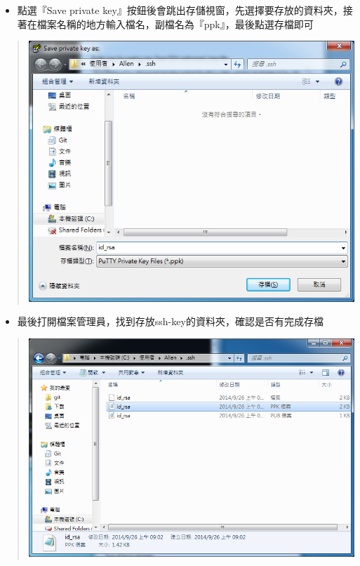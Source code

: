 \documentclass[letterpaper,10pt,english]{sphinxmanual}
\begin{document}
\begin{itemize}
\item {} 
點選『Save private key』按鈕後會跳出存儲視窗，先選擇要存放的資料夾，接著在檔案名稱的地方輸入檔名，副檔名為『ppk』，最後點選存檔即可

\end{itemize}
\begin{quote}

\includegraphics{openssh-putty-007.png}
\end{quote}
\begin{itemize}
\item {} 
最後打開檔案管理員，找到存放ssh-key的資料夾，確認是否有完成存檔

\end{itemize}
\begin{quote}

\includegraphics{openssh-putty-008.png}
\end{quote}
\end{document}
